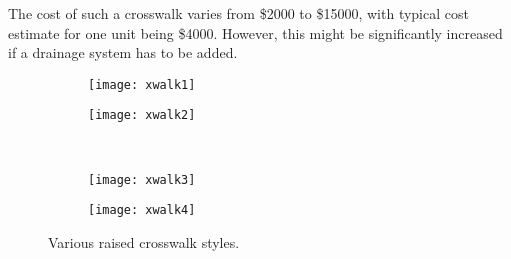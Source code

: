 The cost of such a crosswalk varies from \$2000 to \$15000, with typical cost estimate for one unit being \$4000\cite{traffic-calming-xwalks}. However, this might be significantly increased if a drainage system has to be added.

\begin{figure}[!htbp]
\centering
\begin{subfigure}[t]{0.45\textwidth}
	\texttt{[image: xwalk1]}
\end{subfigure}
\begin{subfigure}[t]{0.45\textwidth}
	\texttt{[image: xwalk2]}
\end{subfigure}\\
\begin{subfigure}[t]{0.45\textwidth}
	\texttt{[image: xwalk3]}
\end{subfigure}
\begin{subfigure}[t]{0.45\textwidth}
	\texttt{[image: xwalk4]}
\end{subfigure}
\caption{Various raised crosswalk styles.\cite{traffic-calming-xwalks}}
\end{figure}